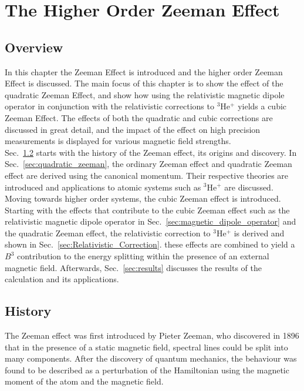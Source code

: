 \chapter{The Higher Order Zeeman Effect}\label{sec:Zeeman-Effect}
    \section{Overview}
        In this chapter the Zeeman Effect is introduced and the higher order Zeeman Effect is discussed. The main focus of this chapter is to show the effect of the quadratic Zeeman Effect, and show how using the relativistic magnetic dipole operator in conjunction with the relativistic corrections to $^3$He$^+$ yields a cubic Zeeman Effect. The effects of both the quadratic and cubic corrections are discussed in great detail, and the impact of the effect on high precision measurements is displayed for various magnetic field strengths.\\

       Sec.~\ref{sec:history} starts with the history of the Zeeman effect, its origins and discovery. In Sec.~\ref{sec:quadratic_zeeman}, the ordinary Zeeman effect and quadratic Zeeman effect are derived using the canonical momentum. Their respective theories are introduced and applications to atomic systems such as $^3$He$^+$ are discussed. Moving towards higher order systems, the cubic Zeeman effect is introduced. Starting with the effects that contribute to the cubic Zeeman effect such as the relativistic magnetic dipole operator in Sec.~\ref{sec:magnetic_dipole_operator} and the quadratic Zeeman effect, the relativistic correction to $^3$He$^+$ is derived and shown in Sec.~\ref{sec:Relativistic_Correction}. these effects are combined to yield a $B^3$ contribution to the energy splitting within the presence of an external magnetic field. Afterwards, Sec.~\ref{sec:results} discusses the results of the calculation and its applications.

    \section{History}\label{sec:history}
        The Zeeman effect was first introduced by Pieter Zeeman, who discovered in 1896 that in the presence of a static magnetic field, spectral lines could be split into many components. After the discovery of quantum mechanics, the behaviour was found to be described as a perturbation of the Hamiltonian using the magnetic moment of the atom and the magnetic field.   \\
    
